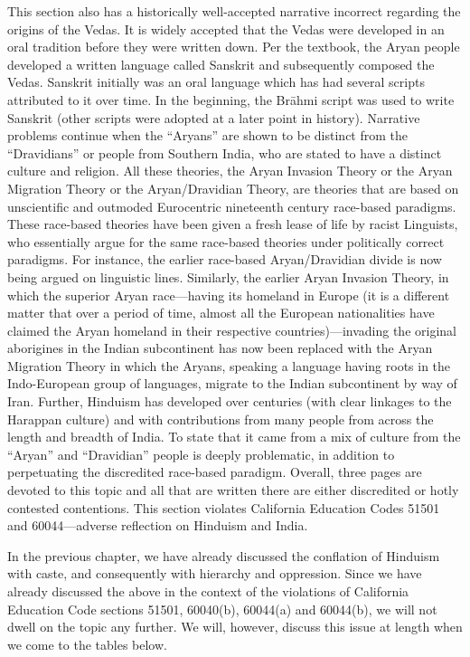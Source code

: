 This section also has a historically well-accepted narrative incorrect regarding the origins of the Vedas. It is widely accepted that the Vedas were developed in an oral tradition before they were written down. Per the textbook, the Aryan people developed a written language called Sanskrit and subsequently composed the Vedas. Sanskrit initially was an oral language which has had several scripts attributed to it over time. In the beginning, the Brāhmi script was used to write Sanskrit (other scripts were adopted at a later point in history). Narrative problems continue when the “Aryans” are shown to be distinct from the “Dravidians” or people from Southern India, who are stated to have a distinct culture and religion. All these theories, the Aryan Invasion Theory or the Aryan Migration Theory or the Aryan/Dravidian Theory, are theories that are based on unscientific and outmoded Eurocentric nineteenth century race-based paradigms. These race-based theories have been given a fresh lease of life by racist Linguists, who essentially argue for the same race-based theories under politically correct paradigms. For instance, the earlier race-based Aryan/Dravidian divide is now being argued on linguistic lines. Similarly, the earlier Aryan Invasion Theory, in which the superior Aryan race—having its homeland in Europe (it is a different matter that over a period of time, almost all the European nationalities have claimed the Aryan homeland in their respective countries)—invading the original aborigines in the Indian subcontinent has now been replaced with the Aryan Migration Theory in which the Aryans, speaking a language having roots in the Indo-European group of languages, migrate to the Indian subcontinent by way of Iran. Further, Hinduism has developed over centuries (with clear linkages to the Harappan culture) and with contributions from many people from across the length and breadth of India. To state that it came from a mix of culture from the “Aryan” and “Dravidian” people is deeply problematic, in addition to perpetuating the discredited race-based paradigm. Overall, three pages are devoted to this topic and all that are written there are either discredited or hotly contested contentions. This section violates California Education Codes 51501 and 60044—adverse reflection on Hinduism and India.  

In the previous chapter, we have already discussed the conflation of Hinduism with caste, and consequently with hierarchy and oppression. Since we have already discussed the above in the context of the violations of California Education Code sections 51501, 60040(b), 60044(a) and 60044(b), we will not dwell on the topic any further. We will, however, discuss this issue at length when we come to the tables below.  


